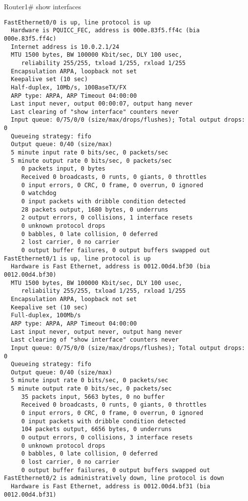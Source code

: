 Router1\# show interfaces
\begin{lstlisting}
FastEthernet0/0 is up, line protocol is up 
  Hardware is PQUICC_FEC, address is 000e.83f5.ff4c (bia 000e.83f5.ff4c)
  Internet address is 10.0.2.1/24
  MTU 1500 bytes, BW 100000 Kbit/sec, DLY 100 usec, 
     reliability 255/255, txload 1/255, rxload 1/255
  Encapsulation ARPA, loopback not set
  Keepalive set (10 sec)
  Half-duplex, 10Mb/s, 100BaseTX/FX
  ARP type: ARPA, ARP Timeout 04:00:00
  Last input never, output 00:00:07, output hang never
  Last clearing of "show interface" counters never
  Input queue: 0/75/0/0 (size/max/drops/flushes); Total output drops: 0
  Queueing strategy: fifo
  Output queue: 0/40 (size/max)
  5 minute input rate 0 bits/sec, 0 packets/sec
  5 minute output rate 0 bits/sec, 0 packets/sec
     0 packets input, 0 bytes
     Received 0 broadcasts, 0 runts, 0 giants, 0 throttles
     0 input errors, 0 CRC, 0 frame, 0 overrun, 0 ignored
     0 watchdog
     0 input packets with dribble condition detected
     28 packets output, 1680 bytes, 0 underruns
     2 output errors, 0 collisions, 1 interface resets
     0 unknown protocol drops
     0 babbles, 0 late collision, 0 deferred
     2 lost carrier, 0 no carrier
     0 output buffer failures, 0 output buffers swapped out
FastEthernet0/1 is up, line protocol is up 
  Hardware is Fast Ethernet, address is 0012.00d4.bf30 (bia 0012.00d4.bf30)
  MTU 1500 bytes, BW 100000 Kbit/sec, DLY 100 usec, 
     reliability 255/255, txload 1/255, rxload 1/255
  Encapsulation ARPA, loopback not set
  Keepalive set (10 sec)
  Full-duplex, 100Mb/s
  ARP type: ARPA, ARP Timeout 04:00:00
  Last input never, output never, output hang never
  Last clearing of "show interface" counters never
  Input queue: 0/75/0/0 (size/max/drops/flushes); Total output drops: 0
  Queueing strategy: fifo
  Output queue: 0/40 (size/max)
  5 minute input rate 0 bits/sec, 0 packets/sec
  5 minute output rate 0 bits/sec, 0 packets/sec
     35 packets input, 5663 bytes, 0 no buffer
     Received 0 broadcasts, 0 runts, 0 giants, 0 throttles
     0 input errors, 0 CRC, 0 frame, 0 overrun, 0 ignored
     0 input packets with dribble condition detected
     104 packets output, 6656 bytes, 0 underruns
     0 output errors, 0 collisions, 3 interface resets
     0 unknown protocol drops
     0 babbles, 0 late collision, 0 deferred
     0 lost carrier, 0 no carrier
     0 output buffer failures, 0 output buffers swapped out
FastEthernet0/2 is administratively down, line protocol is down 
  Hardware is Fast Ethernet, address is 0012.00d4.bf31 (bia 0012.00d4.bf31)

\end{lstlisting}
